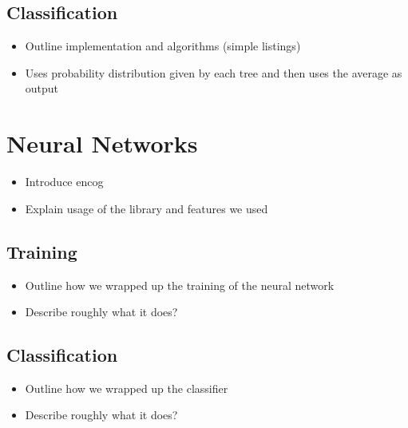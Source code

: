 \documentclass[12pt,twoside,notitlepage]{report}
\begin{document}
      \subsection{Classification} \label{sec:classification}
          \begin{framed}
              \begin{itemize}
                  \item Outline implementation and algorithms (simple listings)
                  \item Uses probability distribution given by each tree and then uses the average as output
              \end{itemize}
          \end{framed}

    \section{Neural Networks}
        \begin{framed}
            \begin{itemize}
                \item Introduce encog
                \item Explain usage of the library and features we used
            \end{itemize}
        \end{framed}

        \subsection{Training}
            \begin{framed}
                \begin{itemize}
                    \item Outline how we wrapped up the training of the neural network
                    \item Describe roughly what it does?
                \end{itemize}
            \end{framed}

        \subsection{Classification}
            \begin{framed}
                \begin{itemize}
                    \item Outline how we wrapped up the classifier
                    \item Describe roughly what it does?
                \end{itemize}
            \end{framed}
\end{document}
